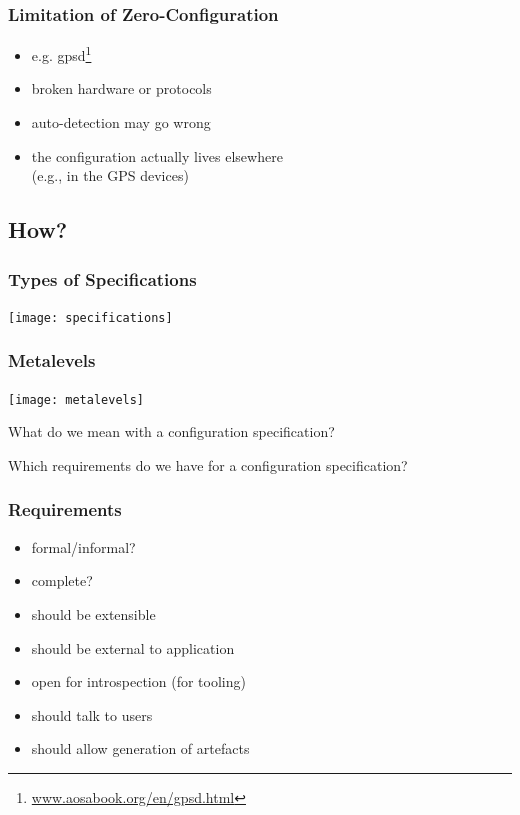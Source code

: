 \begin{frame}
	\frametitle{Limitation of Zero-Configuration}
	\begin{itemize}
	\item e.g. gpsd\footnote{\url{www.aosabook.org/en/gpsd.html}}
	\pause
	\item broken hardware or protocols
	\item auto-detection may go wrong
	\item the configuration actually lives elsewhere \\ (e.g., in the GPS devices)
	\end{itemize}
\end{frame}

\subsection{How?}

\begin{frame}
	\frametitle{Types of Specifications}
	\texttt{[image: specifications]}
\end{frame}

\begin{frame}
	\frametitle{Metalevels}
	\texttt{[image: metalevels]}
\end{frame}

\begin{assignment}
	\begin{task}
	What do we mean with a configuration specification?
	\end{task}

	\begin{task}
	Which requirements do we have for a configuration specification?
	\end{task}
\end{assignment}


\begin{frame}
	\frametitle{Requirements}

	\begin{itemize}
	\item formal/informal?
	\item complete?
	\pause
	\item should be extensible
	\item should be external to application
	\item open for introspection (for tooling)
	\item should talk to users
	\item should allow generation of artefacts
	\end{itemize}
\end{frame}


